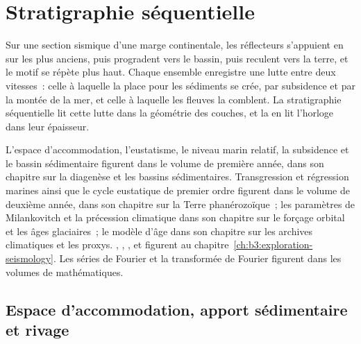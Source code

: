 \chapter{Stratigraphie séquentielle}\label{ch:b3:sequence-stratigraphy}

Sur une section sismique d'une marge continentale, les réflecteurs s'appuient en  sur les plus anciens,
puis progradent vers le bassin, puis reculent vers la terre, et le motif
se répète plus haut. Chaque ensemble enregistre une lutte entre
deux vitesses~: celle à laquelle la place pour les sédiments se crée, par subsidence et par
la montée de la mer, et celle à laquelle les fleuves la comblent. La stratigraphie séquentielle
lit cette lutte dans la géométrie des couches, et
la  en lit l'horloge dans leur épaisseur.

\begin{recall}
L'espace d'accommodation, l'eustatisme, le niveau marin relatif, la subsidence et le
bassin sédimentaire figurent dans le volume de première année, dans son chapitre sur la diagenèse et les
bassins sédimentaires. Transgression et régression marines ainsi que le cycle eustatique de premier
ordre figurent dans le volume de deuxième année, dans son chapitre sur la Terre phanérozoïque~;
les paramètres de Milankovitch et la précession climatique dans son chapitre sur le
forçage orbital et les âges glaciaires~; le modèle d'âge dans son chapitre sur les archives
climatiques et les proxys. , , ,  et
 figurent au chapitre~\ref{ch:b3:exploration-seismology}. Les séries de Fourier
et la transformée de Fourier figurent dans les volumes de mathématiques.
\end{recall}

\section{Espace d'accommodation, apport sédimentaire et rivage}\label{sec:b3:sequence-stratigraphy:shoreline}

